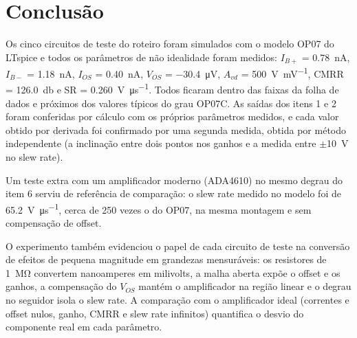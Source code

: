 \section{Conclusão}
\label{sec:conclusao}

Os cinco circuitos de teste do roteiro foram simulados com o modelo
OP07 do LTspice e todos os parâmetros de não idealidade foram medidos:
$I_{B+}$ = \SI{0.78}{\nano\ampere}, $I_{B-}$ =
\SI{1.18}{\nano\ampere}, $I_{OS}$ =
\SI{0.40}{\nano\ampere}, $V_{OS}$ = \SI{-30.4}{\micro\volt},
$A_{vd}$ = \SI{500}{\volt\per\milli\volt}, CMRR =
\SI{126.0}{\decibel} e SR = \SI{0.260}{\volt\per\micro\second}.
Todos ficaram dentro das faixas da folha de dados e próximos dos valores
típicos do grau OP07C. As saídas dos itens 1 e 2 foram conferidas por
cálculo com os próprios parâmetros medidos, e cada valor obtido por
derivada foi confirmado por uma segunda medida, obtida por método
independente (a inclinação entre dois pontos nos ganhos e a medida
entre $\pm$\SI{10}{\volt} no slew rate).

Um teste extra com um amplificador moderno (ADA4610) no mesmo degrau do
item 6 serviu de referência de comparação: o slew rate medido no modelo
foi de \SI{65.2}{\volt\per\micro\second}, cerca de 250 vezes o do OP07,
na mesma montagem e sem compensação de offset.

O experimento também evidenciou o papel de cada circuito de teste na
conversão de efeitos de pequena magnitude em grandezas mensuráveis: os
resistores de \SI{1}{\mega\ohm} convertem nanoamperes em milivolts, a
malha aberta expõe o offset e os ganhos, a compensação do $V_{OS}$
mantém o amplificador na região linear e o degrau no seguidor isola o
slew rate. A comparação com o amplificador ideal (correntes e offset
nulos, ganho, CMRR e slew rate infinitos) quantifica o desvio do
componente real em cada parâmetro.
